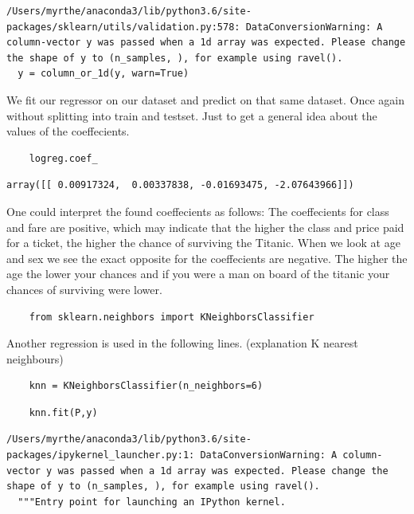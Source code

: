 \documentclass[11pt]{article}
\begin{document}
\begin{verbatim}
/Users/myrthe/anaconda3/lib/python3.6/site-packages/sklearn/utils/validation.py:578: DataConversionWarning: A column-vector y was passed when a 1d array was expected. Please change the shape of y to (n_samples, ), for example using ravel().
  y = column_or_1d(y, warn=True)

\end{verbatim}

We fit our regressor on our dataset and predict on that same dataset.
Once again without splitting into train and testset. Just to get a
general idea about the values of the coeffecients.

\begin{verbatim}
    logreg.coef_
\end{verbatim}

\begin{verbatim}
array([[ 0.00917324,  0.00337838, -0.01693475, -2.07643966]])
\end{verbatim}

One could interpret the found coeffecients as follows: The coeffecients
for class and fare are positive, which may indicate that the higher the
class and price paid for a ticket, the higher the chance of surviving
the Titanic. When we look at age and sex we see the exact opposite for
the coeffecients are negative. The higher the age the lower your chances
and if you were a man on board of the titanic your chances of surviving
were lower.

\begin{verbatim}
    from sklearn.neighbors import KNeighborsClassifier
\end{verbatim}

Another regression is used in the following lines. (explanation K
nearest neighbours)

\begin{verbatim}
    knn = KNeighborsClassifier(n_neighbors=6)
\end{verbatim}

\begin{verbatim}
    knn.fit(P,y)
\end{verbatim}

\begin{verbatim}
/Users/myrthe/anaconda3/lib/python3.6/site-packages/ipykernel_launcher.py:1: DataConversionWarning: A column-vector y was passed when a 1d array was expected. Please change the shape of y to (n_samples, ), for example using ravel().
  """Entry point for launching an IPython kernel.

\end{verbatim}
\end{document}
